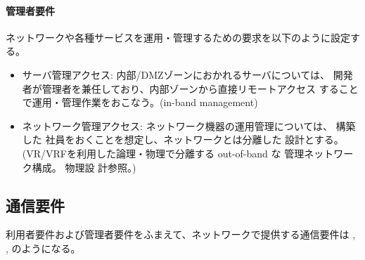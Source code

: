     \paragraph{管理者要件}
ネットワークや各種サービスを運用・管理するための要求を以下のように設定する。
\begin{itemize}
 \item サーバ管理アクセス: 内部/DMZゾーンにおかれるサーバについては、\yo
       開発者が管理者を兼任しており、内部ゾーンから直接リモートアクセス
       することで運用・管理作業をおこなう。(in-band management)
 \item ネットワーク管理アクセス: ネットワーク機器の運用管理については、
       構築した \tj 社員をおくことを想定し、\yo ネットワークとは分離した
       設計とする。(VR/VRFを利用した論理・物理で分離する out-of-band な
       管理ネットワーク構成。 物理設
       計参照。)
\end{itemize}

  \subsection{通信要件}

利用者要件および管理者要件をふまえて、ネットワークで提供する通信要件は
, ,
 のようになる。

